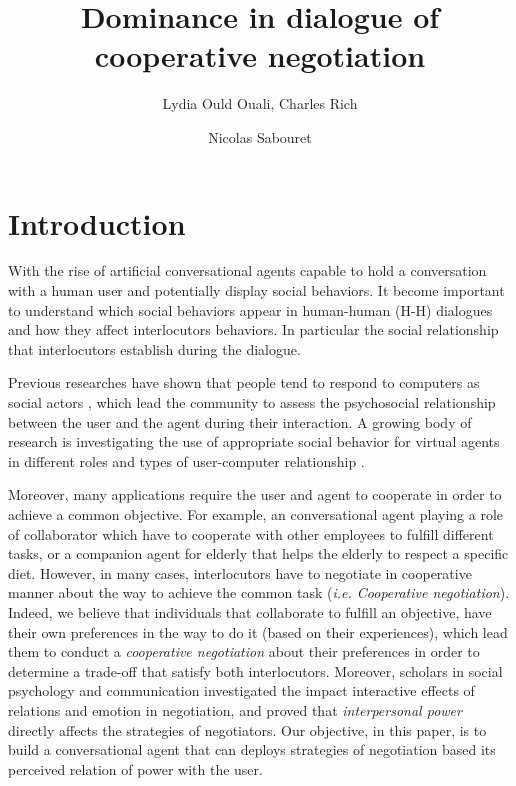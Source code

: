 \documentclass{llncs}
\begin{document}
	\title{\vskip -10pt Dominance in dialogue of cooperative negotiation}
	
	\author{Lydia Ould Ouali, Charles Rich \and
		Nicolas Sabouret }
	

	\maketitle
	\section{Introduction}
	\par With the rise of artificial conversational agents capable to hold a conversation with a human user and potentially display social behaviors. It become important to understand which social behaviors appear in human-human (H-H) dialogues and how they affect interlocutors behaviors. In particular the social relationship that interlocutors establish during the dialogue.
	
	Previous researches have shown that people tend to respond to computers as social actors \cite{bickmore2005establishing}, which lead the community to assess the psychosocial relationship between the user and the agent during their interaction. 
	A growing body of research is investigating the use of appropriate social behavior for virtual agents in different roles and types of user-computer relationship \cite{bickmore2005s,bickmore2005establishing,kidd2005sociable}.

	Moreover, many applications require the user and agent to cooperate in order to achieve a common objective. For example, an conversational agent playing a role of collaborator which have to cooperate with other employees to fulfill different tasks, or a companion agent for elderly that helps the elderly to respect a specific diet. However, in many cases, interlocutors have to negotiate in cooperative manner about the way to achieve the common task (\emph{i.e. Cooperative negotiation}). 	Indeed, we believe that individuals that collaborate to fulfill an objective, have their own preferences in the way to do it (based on their experiences), which lead them to conduct a \emph{cooperative negotiation} about their preferences in order to determine a trade-off that satisfy both interlocutors. Moreover, scholars in social psychology and communication investigated \cite{dunbar2005perceptions,de1995impact} the impact interactive effects of relations and emotion in negotiation, and proved that  \emph{interpersonal power} directly affects the strategies of negotiators. Our objective, in this paper, is to build a conversational agent that can deploys strategies of negotiation based its perceived relation of power with the user. 
\end{document}
